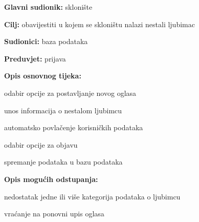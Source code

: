 					\noindent {}
					\begin{packed_item}
						
						\item \textbf{Glavni sudionik: } sklonište
						\item  \textbf{Cilj:} obavijestiti u kojem se skloništu nalazi nestali ljubimac
						\item  \textbf{Sudionici:} baza podataka
						\item  \textbf{Preduvjet:} prijava
						\item  \textbf{Opis osnovnog tijeka:}
						
						\item[] \begin{packed_enum}
							
							\item odabir opcije za postavljanje novog oglasa
							\item unos informacija o nestalom ljubimcu
							\item automatsko povlačenje korisničkih podataka
							\item odabir opcije za objavu
							\item spremanje podataka u bazu podataka
						\end{packed_enum}
						
						\item  \textbf{Opis mogućih odstupanja:}
						
						\item[] \begin{packed_item}
							
							\item[4.a] nedostatak jedne ili više kategorija podataka o ljubimcu
							\item[] \begin{packed_enum}
								\item  vraćanje na ponovni upis oglasa
							\end{packed_enum}
							
						\end{packed_item}
					\end{packed_item}
					
